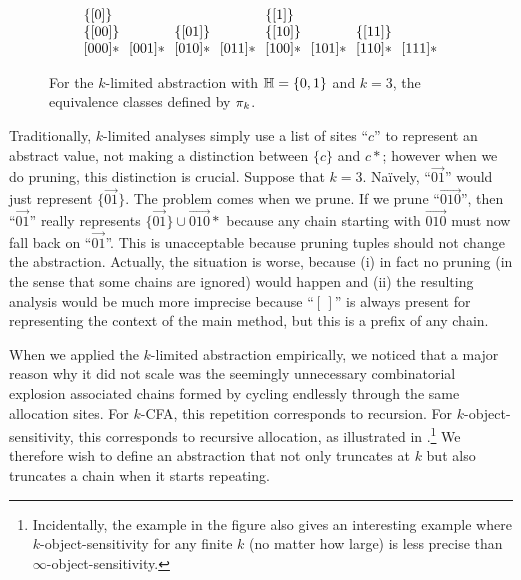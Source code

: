 \begin{figure}
\[
\arraycolsep=3.5pt
\begin{array}{llllllll}
\{\vec{0}\}    &            &              &            & \{\vec{1}\} \\
\{\vec{00}\}   &            & \{\vec{01}\} &            & \{\vec{10}\} &            & \{\vec{11}\} \\
\vec{000}*     & \vec{001}* & \vec{010}*   & \vec{011}* & \vec{100}*   & \vec{101}* & \vec{110}* & \vec{111}*
\end{array}
\]
\caption{\label{fig:repeatingExample} For the $k$-limited abstraction
with ${\mathbb H} = \{ 0, 1 \}$ and $k = 3$, the equivalence classes defined by $\pi_k$.
}
\end{figure}

Traditionally, $k$-limited analyses
simply use a list of sites ``$c$'' to represent an abstract value,
not making a distinction between $\{c\}$ and $c*$;
however when we do pruning, this distinction is crucial.
Suppose that $k=3$.
Na\"ively, ``$\vec{01}$'' would just represent $\{\vec{01}\}$.
The problem comes when we prune.
If we prune ``$\vec{010}$'', then ``$\vec{01}$'' really represents $\{\vec{01}\}\cup \vec{010}*$
because any chain starting with $\vec{010}$ must now fall back on ``$\vec{01}$''.
This is unacceptable because pruning tuples should not change the abstraction.
Actually, the situation is worse, because (i) in fact no pruning
(in the sense that some chains are ignored)
would happen and (ii) the resulting analysis would be much more imprecise because
``$[\,]$'' is always present for representing the context of the main method,
but this is a prefix of any chain.


When we applied the $k$-limited abstraction empirically,
we noticed that a major reason why it did not scale was
the seemingly unnecessary combinatorial explosion associated chains formed
by cycling endlessly through the same allocation sites.
For $k$-CFA, this repetition corresponds to recursion.
For $k$-object-sensitivity, this corresponds to recursive allocation, as
illustrated in .\footnote{
Incidentally, the example in the figure also gives an interesting example where
$k$-object-sensitivity for any finite $k$ (no matter how large) is less precise
than $\infty$-object-sensitivity.}
We therefore wish to define an abstraction that not only truncates at $k$ but also truncates
a chain when it starts repeating.

